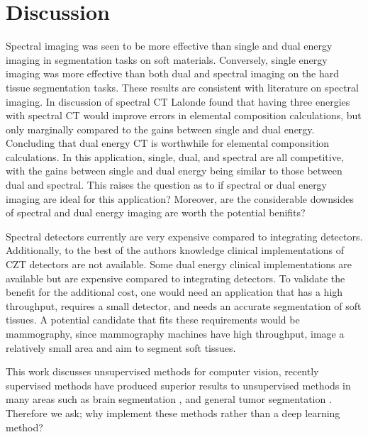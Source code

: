 \documentclass[a4paper,11pt]{article}
\begin{document}

\section{Discussion}

Spectral imaging was seen to be more effective than single and dual energy imaging in segmentation tasks on soft materials. Conversely, single energy imaging was more effective than both dual and spectral imaging on the hard tissue segmentation tasks. These results are consistent with literature on spectral imaging. In discussion of spectral CT Lalonde \cite{Lalonde2016ACT} found that having three energies with spectral CT would improve errors in elemental composition calculations, but only marginally compared to the gains between single and dual energy. Concluding that dual energy CT is worthwhile for elemental componsition calculations. In this application, single, dual, and spectral are all competitive, with the gains between single and dual energy being similar to those between dual and spectral. This raises the question as to if spectral or dual energy imaging are ideal for this application? Moreover, are the considerable downsides of spectral and dual energy imaging are worth the potential benifits?

Spectral detectors currently are very expensive compared to integrating detectors. Additionally, to the best of the authors knowledge clinical implementations of CZT detectors are not available. Some dual energy clinical implementations are available but are expensive compared to integrating detectors. To validate the benefit for the additional cost, one would need an application that has a high throughput, requires a small detector, and needs an accurate segmentation of soft tissues. A potential candidate that fits these requirements would be mammography, since mammography machines have high throughput, image a relatively small area and aim to segment soft tissues. 

This work discusses unsupervised methods for computer vision, recently supervised methods have produced superior results to unsupervised methods in many areas such as brain segmentation \cite{spyridon}, and general tumor segmentation \cite{medicalsegmentationdecathlon}. Therefore we ask; why implement these methods rather than a deep learning method?
\end{document}
